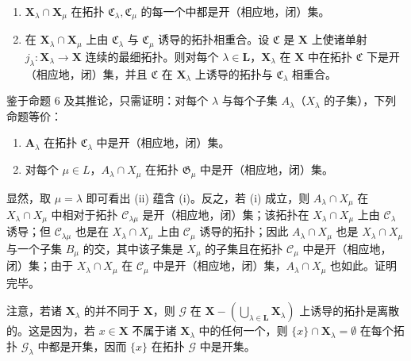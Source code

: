 \begin{enumerate}
\def\labelenumi{\arabic{enumi})}
\item
  \(\mathbf{X}_{\lambda} \cap \mathbf{X}_{\mu}\) 在拓扑 \(\mathfrak{C}_{\lambda}, \mathfrak{C}_{\mu}\) 的每一个中都是开（相应地，闭）集。
\item
  在 \(\mathbf{X}_{\lambda} \cap \mathbf{X}_{\mu}\) 上由 \(\mathfrak{C}_{\lambda}\) 与 \(\mathfrak{C}_{\mu}\) 诱导的拓扑相重合。设 \(\mathfrak{C}\) 是 \(\mathbf{X}\) 上使诸单射 \(j_{\lambda}: \mathbf{X}_{\lambda} \to \mathbf{X}\) 连续的最细拓扑。则对每个 \(\lambda \in \mathbf{L}\)，\(\mathbf{X}_{\lambda}\) 在 \(\mathbf{X}\) 中在拓扑 \(\mathfrak{C}\) 下是开（相应地，闭）集，并且 \(\mathfrak{C}\) 在 \(\mathbf{X}_{\lambda}\) 上诱导的拓扑与 \(\mathfrak{C}_{\lambda}\) 相重合。
\end{enumerate}

鉴于命题 6 及其推论，只需证明：对每个 \(\lambda\) 与每个子集 \(A_{\lambda}\)（\(X_{\lambda}\) 的子集），下列命题等价：

\begin{enumerate}
\def\labelenumi{(\roman{enumi})}
\item
  \(\mathbf{A}_{\lambda}\) 在拓扑 \(\mathfrak{C}_{\lambda}\) 中是开（相应地，闭）集。
\item
  对每个 \(\mu \in L\)，\(A_{\lambda} \cap X_{\mu}\) 在拓扑 \(\mathfrak{G}_{\mu}\) 中是开（相应地，闭）集。
\end{enumerate}

显然，取 \(\mu = \lambda\) 即可看出 (ii) 蕴含 (i)。反之，若 (i) 成立，则 \(A_{\lambda} \cap X_{\mu}\) 在 \(X_{\lambda} \cap X_{\mu}\) 中相对于拓扑 \(\mathcal{C}_{\lambda\mu}\) 是开（相应地，闭）集；该拓扑在 \(X_{\lambda} \cap X_{\mu}\) 上由 \(\mathcal{C}_{\lambda}\) 诱导；但 \(\mathcal{C}_{\lambda\mu}\) 也是在 \(X_{\lambda} \cap X_{\mu}\) 上由 \(\mathcal{C}_{\mu}\) 诱导的拓扑；因此 \(A_{\lambda} \cap X_{\mu}\) 也是 \(X_{\lambda} \cap X_{\mu}\) 与一个子集 \(B_{\mu}\) 的交，其中该子集是 \(X_{\mu}\) 的子集且在拓扑 \(\mathcal{C}_{\mu}\) 中是开（相应地，闭）集；由于 \(X_{\lambda} \cap X_{\mu}\) 在 \(\mathcal{C}_{\mu}\) 中是开（相应地，闭）集，\(A_{\lambda} \cap X_{\mu}\) 也如此。证明完毕。

注意，若诸 \(\mathbf{X}_{\lambda}\) 的并不同于 \(\mathbf{X}\)，则 \(\mathcal{G}\) 在 \(\mathbf{X} - \left(\bigcup_{\lambda \in \mathbf{L}} \mathbf{X}_{\lambda}\right)\) 上诱导的拓扑是离散的。这是因为，若 \(x \in \mathbf{X}\) 不属于诸 \(\mathbf{X}_{\lambda}\) 中的任何一个，则 \(\{x\} \cap \mathbf{X}_{\lambda} = \emptyset\) 在每个拓扑 \(\mathcal{G}_{\lambda}\) 中都是开集，因而 \(\{x\}\) 在拓扑 \(\mathcal{G}\) 中是开集。

